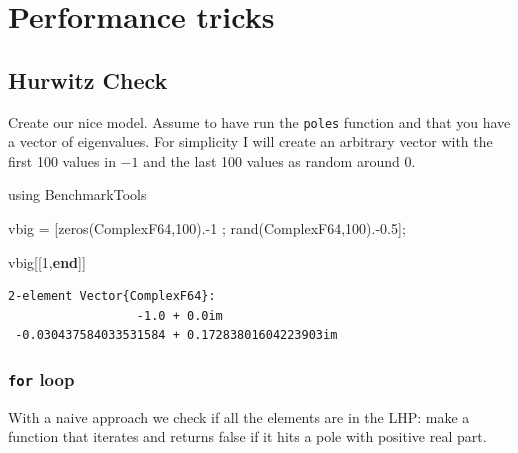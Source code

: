 \documentclass[
  a4paper,
  DIV=11,
  numbers=noendperiod]{scrreprt}
\newenvironment{Shaded}{\begin{snugshade}}{\end{snugshade}}
\newcommand{\BuiltInTok}[1]{\textcolor[rgb]{0.00,0.23,0.31}{#1}}
\newcommand{\ConstantTok}[1]{\textcolor[rgb]{0.56,0.35,0.01}{#1}}
\newcommand{\ControlFlowTok}[1]{\textcolor[rgb]{0.00,0.23,0.31}{\textbf{#1}}}
\newcommand{\DataTypeTok}[1]{\textcolor[rgb]{0.68,0.00,0.00}{#1}}
\newcommand{\FloatTok}[1]{\textcolor[rgb]{0.68,0.00,0.00}{#1}}
\newcommand{\FunctionTok}[1]{\textcolor[rgb]{0.28,0.35,0.67}{#1}}
\newcommand{\ImportTok}[1]{\textcolor[rgb]{0.00,0.46,0.62}{#1}}
\newcommand{\KeywordTok}[1]{\textcolor[rgb]{0.00,0.23,0.31}{\textbf{#1}}}
\newcommand{\NormalTok}[1]{\textcolor[rgb]{0.00,0.23,0.31}{#1}}
\newcommand{\OperatorTok}[1]{\textcolor[rgb]{0.37,0.37,0.37}{#1}}
\newcommand{\PreprocessorTok}[1]{\textcolor[rgb]{0.68,0.00,0.00}{#1}}
\begin{document}


\cleardoublepage
{}
{}
\appendix

\chapter{Performance tricks}\label{performance-tricks}

\section{Hurwitz Check}\label{hurwitz-check}

Create our nice model. Assume to have run the \texttt{poles} function
and that you have a vector of eigenvalues. For simplicity I will create
an arbitrary vector with the first 100 values in \(-1\) and the last 100
values as random around \(0\).

\begin{Shaded}
\begin{Highlighting}[]
\ImportTok{using} \BuiltInTok{BenchmarkTools}

\NormalTok{vbig }\OperatorTok{=}\NormalTok{ [}\FunctionTok{zeros}\NormalTok{(}\DataTypeTok{ComplexF64}\NormalTok{,}\FloatTok{100}\NormalTok{)}\OperatorTok{.{-}}\FloatTok{1}\NormalTok{ ; }\FunctionTok{rand}\NormalTok{(}\DataTypeTok{ComplexF64}\NormalTok{,}\FloatTok{100}\NormalTok{)}\OperatorTok{.{-}}\FloatTok{0.5}\NormalTok{];}

\NormalTok{vbig[[}\FloatTok{1}\NormalTok{,}\KeywordTok{end}\NormalTok{]]}
\end{Highlighting}
\end{Shaded}

\begin{verbatim}
2-element Vector{ComplexF64}:
                  -1.0 + 0.0im
 -0.030437584033531584 + 0.17283801604223903im
\end{verbatim}

\subsection{\texorpdfstring{\texttt{for}
loop}{for loop}}\label{for-loop}

With a naive approach we check if all the elements are in the LHP: make
a function that iterates and returns false if it hits a pole with
positive real part.

\begin{Shaded}
\end{Shaded}
\end{document}
